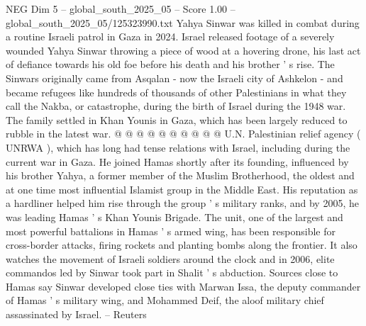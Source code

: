 \begin{textsample}{NEG Dim 5 – global\_south\_2025\_05 – Score 1.00 – global\_south\_2025\_05/125323990.txt}
Yahya Sinwar was killed in combat during a routine Israeli patrol in Gaza in 2024.
Israel released footage of a severely wounded Yahya Sinwar throwing a piece of wood at a hovering drone, his last act of defiance towards his old foe before his death and his brother ' s rise.
The Sinwars originally came from Asqalan - now the Israeli city of Ashkelon - and became refugees like hundreds of thousands of other Palestinians in what they call the Nakba, or catastrophe, during the birth of Israel during the 1948 war.
The family settled in Khan Younis in Gaza, which has been largely reduced to rubble in the latest war. @ @ @ @ @ @ @ @ @ @ U.N.
Palestinian relief agency ( UNRWA ), which has long had tense relations with Israel, including during the current war in Gaza.
He joined Hamas shortly after its founding, influenced by his brother Yahya, a former member of the Muslim Brotherhood, the oldest and at one time most influential Islamist group in the Middle East.
His reputation as a hardliner helped him rise through the group ' s military ranks, and by 2005, he was leading Hamas ' s Khan Younis Brigade.
The unit, one of the largest and most powerful battalions in Hamas ' s armed wing, has been responsible for cross-border attacks, firing rockets and planting bombs along the frontier.
It also watches the movement of Israeli soldiers around the clock and in 2006, elite commandos led by Sinwar took part in Shalit ' s abduction.
Sources close to Hamas say Sinwar developed close ties with Marwan Issa, the deputy commander of Hamas ' s military wing, and Mohammed Deif, the aloof military chief assassinated by Israel. -- Reuters

\end{textsample}
